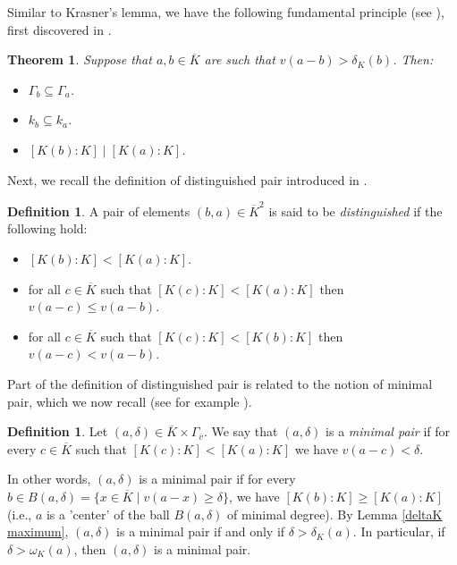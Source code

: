 \documentclass[10pt]{article}
\numberwithin{equation}{section}
\newtheorem{Thm}[equation]{Theorem}
\theoremstyle{definition}\newtheorem{Def}[equation]{Definition}
\theoremstyle{definition}\newtheorem{Ques}[equation]{Question}
\begin{document}
Similar to Krasner's lemma, we have the following fundamental principle (see \cite[Theorem 1.1]{KhaSa}), first discovered in \cite{PZstructure}.
\begin{Thm}\label{propertydistinguished}
Suppose that $a,b\in\overline{K}$ are such that $v(a-b)>\delta_K(b)$. Then:
\begin{itemize}
\item[i)] $\Gamma_{b}\subseteq\Gamma_{a}$.
\item[ii)] $k_{b}\subseteq k_{a}$.
\item[iii)] $[K(b):K]\mid [K(a):K]$.
\end{itemize}
\end{Thm}
Next, we recall the definition of distinguished pair introduced in \cite[p. 105]{PZstructure}.
\begin{Def}
A pair of elements $(b,a)\in\overline{K}^2$ is said to be \emph{distinguished} if the following hold:
\begin{itemize}
\item[i)] $[K(b):K]<[K(a):K]$.
\item[ii)] for all $c\in\overline{K}$ such that $[K(c):K]<[K(a):K]$ then $v(a-c)\leq v(a-b)$.
\item[iii)] for all $c\in\overline{K}$ such that $[K(c):K]<[K(b):K]$ then $v(a-c)< v(a-b)$.
\end{itemize}
\end{Def}
Part of the definition of distinguished pair is related to the notion of minimal pair, which we now recall (see for example \cite{APZAll, APZTheorem, APZMinimal}). 
\begin{Def}
Let $(a,\delta)\in\overline{K}\times\Gamma_{\overline{v}}$. We say that $(a,\delta)$ is a \emph{minimal pair} if for every $c\in\overline{K}$ such that $[K(c):K]<[K(a):K]$ we have $v(a-c)<\delta$.
\end{Def}
In other words, $(a,\delta)$ is a minimal pair if for every $b\in B(a,\delta)=\{x\in\overline{K}\mid v(a-x)\geq\delta\}$, we have $[K(b):K]\geq[K(a):K]$ (i.e., $a$ is a 'center' of the ball $B(a,\delta)$ of minimal degree). By Lemma \ref{deltaK maximum}, $(a,\delta)$ is a minimal pair if and only if $\delta>\delta_K(a)$. In particular, if $\delta>\omega_K(a)$, then $(a,\delta)$ is a minimal pair.
\end{document}
